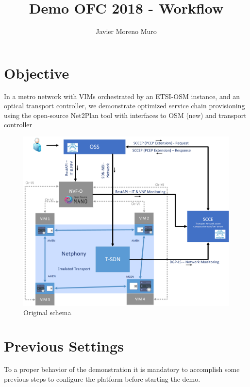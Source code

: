 \documentclass[]{scrartcl}
\title{Demo OFC 2018 - Workflow}
\author{Javier Moreno Muro}
\begin{document}
\maketitle


\section{Objective}

In a metro network with VIMs orchestrated by an ETSI-OSM instance, and an optical transport controller, we demonstrate optimized service chain provisioning using the open-source Net2Plan tool with interfaces to OSM (new) and transport controller

\begin{figure}[h!]
	\centering
	\label{fig:original}
	\includegraphics[width=13cm]{diseño}
	\caption{Original schema}
\end{figure}
\section{Previous Settings}

To a proper behavior of the demonstration it is mandatory to accomplish some previous steps to configure the platform before starting the demo. 
\end{document}
